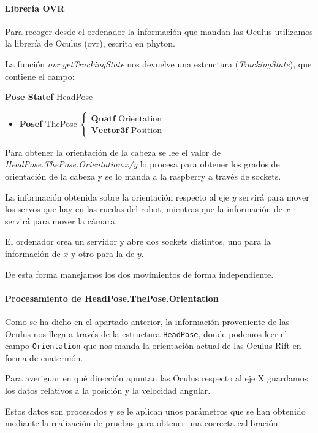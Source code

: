 \documentclass[twoside, 12pt]{epstfg}
\begin{document}
\paragraph{Librería OVR}
Para recoger desde el ordenador la información que mandan las Oculus utilizamos la librería de Oculus (ovr), escrita en phyton.

La función \textit{ovr.getTrackingState} nos devuelve una estructura (\textit{TrackingState}), que contiene el campo:

\textbf{Pose Statef} HeadPose 
\begin{itemize}
	\item \textbf{Posef} ThePose $\begin{cases}
	\textbf{Quatf} \text{ Orientation}\\
	\textbf{Vector3f}\text{ Position} 
	\end{cases}$
	
	
\end{itemize}

Para obtener la orientación de la cabeza se lee el valor de \textit{HeadPose.ThePose.Orientation.x/y} lo procesa para obtener los grados de orientación de la cabeza y se lo manda a la raspberry a través de sockets.

La información obtenida sobre la orientación respecto al eje $y$ servirá para mover los servos que hay en las ruedas del robot, mientras que la información de $x$ servirá para mover la cámara.


El ordenador crea un servidor y abre dos sockets distintos, uno para la información de $x$ y otro para la de $y$.


De esta forma manejamos los dos movimientos de forma independiente.


\paragraph{Procesamiento de HeadPose.ThePose.Orientation}

Como se ha dicho en el apartado anterior, la información proveniente de las Oculus nos llega a través de la estructura \texttt{HeadPose}, donde podemos leer el campo \texttt{Orientation} que nos manda la orientación actual de las Oculus Rift en forma de cuaternión.

Para averiguar en qué dirección apuntan las Oculus respecto al eje X guardamos los datos relativos a la posición y la velocidad angular.

 Estos datos son procesados y se le aplican unos parámetros que se han obtenido mediante la realización de pruebas para obtener una correcta calibración.
\end{document}
